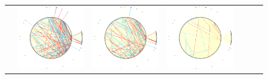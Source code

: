 \documentclass{bioinfo}
\begin{document}
\begin{figure}
\begin{tabular}{lcccccc}
&     \includegraphics[scale=0.16]{results/mut/t4.png}
&     \includegraphics[scale=0.16]{results/mut/t5.png}
&     \includegraphics[scale=0.16]{results/mut/t6.png} \\

\end{tabular}
\end{figure}
\end{document}
